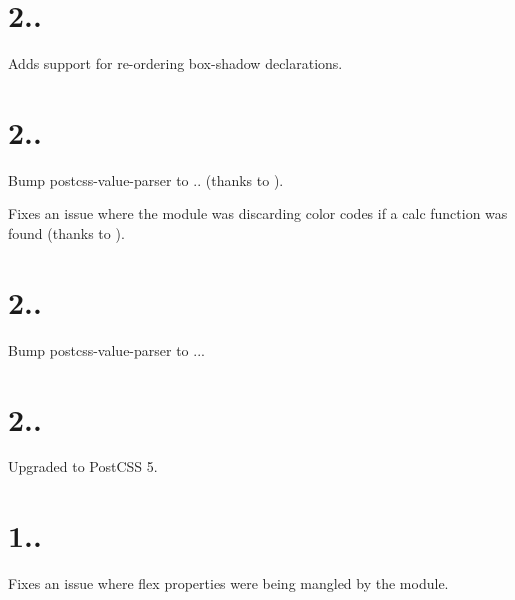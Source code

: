 \section*{2..}


\begin{DoxyItemize}
\item Adds support for re-\/ordering {\ttfamily box-\/shadow} declarations.
\end{DoxyItemize}

\section*{2..}


\begin{DoxyItemize}
\item Bump postcss-\/value-\/parser to {..} (thanks to ).
\item Fixes an issue where the module was discarding color codes if a {\ttfamily calc} function was found (thanks to ).
\end{DoxyItemize}

\section*{2..}


\begin{DoxyItemize}
\item Bump postcss-\/value-\/parser to {..}.
\end{DoxyItemize}

\section*{2..}


\begin{DoxyItemize}
\item Upgraded to Post\+C\+SS 5.
\end{DoxyItemize}

\section*{1..}


\begin{DoxyItemize}
\item Fixes an issue where {\ttfamily flex} properties were being mangled by the module.
\end{DoxyItemize}

